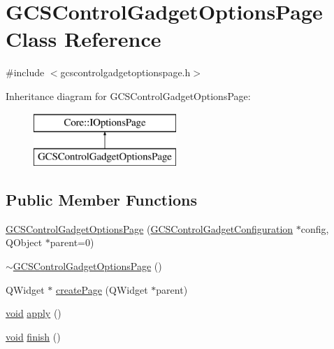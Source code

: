 \hypertarget{class_g_c_s_control_gadget_options_page}{\section{\-G\-C\-S\-Control\-Gadget\-Options\-Page \-Class \-Reference}
\label{class_g_c_s_control_gadget_options_page}
}


{\ttfamily \#include $<$gcscontrolgadgetoptionspage.\-h$>$}

\-Inheritance diagram for \-G\-C\-S\-Control\-Gadget\-Options\-Page\-:\begin{figure}[H]
\begin{center}
\leavevmode
\includegraphics[height=2.000000cm]{class_g_c_s_control_gadget_options_page}
\end{center}
\end{figure}
\subsection*{\-Public \-Member \-Functions}
\begin{DoxyCompactItemize}
\item 
\hyperlink{group___g_c_s_control_gadget_plugin_ga133610c0fce1048e9c145e0e6f4ff7b8}{\-G\-C\-S\-Control\-Gadget\-Options\-Page} (\hyperlink{class_g_c_s_control_gadget_configuration}{\-G\-C\-S\-Control\-Gadget\-Configuration} $\ast$config, \-Q\-Object $\ast$parent=0)
\item 
\hyperlink{group___g_c_s_control_gadget_plugin_ga1dbf3c631b0254ac184bfa202ea00b17}{$\sim$\-G\-C\-S\-Control\-Gadget\-Options\-Page} ()
\item 
\-Q\-Widget $\ast$ \hyperlink{group___g_c_s_control_gadget_plugin_ga581ba836a94117d6d887ee555a4917c6}{create\-Page} (\-Q\-Widget $\ast$parent)
\item 
\hyperlink{group___u_a_v_objects_plugin_ga444cf2ff3f0ecbe028adce838d373f5c}{void} \hyperlink{group___g_c_s_control_gadget_plugin_gad8fa5da9631986d02639e5b520028c91}{apply} ()
\item 
\hyperlink{group___u_a_v_objects_plugin_ga444cf2ff3f0ecbe028adce838d373f5c}{void} \hyperlink{group___g_c_s_control_gadget_plugin_ga99dea02a466b40903d82ed298e62a038}{finish} ()
\end{DoxyCompactItemize}
